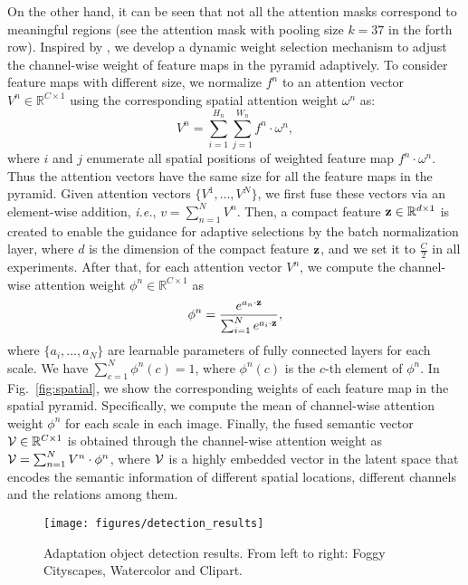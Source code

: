 \documentclass[runningheads]{llncs}
\def\ie{{\em i.e.}}
\begin{document}
On the other hand, it can be seen that not all the attention masks correspond to meaningful regions (see the attention mask with pooling size $k=37$ in the forth row). Inspired by \cite{DBLP:conf/cvpr/LiW0019}, we develop a dynamic weight selection mechanism to adjust the channel-wise weight of feature maps in the pyramid adaptively. To consider feature maps with different size, we normalize $f^n$ to an attention vector $V^{n} \in \mathbb{R}^{C \times 1}$ using the corresponding spatial attention weight $\omega^n$ as:
\begin{equation}
V^n = \sum_{i=1}^{H_n}\sum_{j=1}^{W_n}{f^n \cdot \omega^n},
\end{equation}
where $i$ and $j$ enumerate all spatial positions of weighted feature map $f^n \cdot \omega^n$. Thus the attention vectors have the same size for all the feature maps in the pyramid. Given attention vectors $\{V^1,\dots,V^N\}$, we first fuse these vectors via an element-wise addition, \ie, $v=\sum_{n=1}^NV^n$. Then, a compact feature ${\bf z} \in \mathbb{R}^{d \times 1}$ is created to enable the guidance for adaptive selections by the batch normalization layer, where $d$ is the dimension of the compact feature ${\bf z}$, and we set it to $\frac{C}{2}$ in all experiments. After that, for each attention vector $V^n$, we compute the channel-wise attention weight $\phi^n \in \mathbb{R}^{C \times 1}$ as
\begin{equation}
\phi^n = \frac{e^{a_n\cdot{\bf z}}}{\sum_{i=1}^N{e^{a_i\cdot{\bf z}}}},
\end{equation}
where $\{a_i, \dots, a_N\}$ are learnable parameters of fully connected layers for each scale. We have $\sum_{c=1}^N{\phi^n(c)}=1$, where $\phi^n(c)$ is the $c$-th element of $\phi^n$. In Fig.~\ref{fig:spatial}, we show the corresponding weights of each feature map in the spatial pyramid. Specifically, we compute the mean of channel-wise attention weight $\phi^n$ for each scale in each image. Finally, the fused semantic vector ${\cal V}\in \mathbb{R}^{C \times 1}$ is obtained through the channel-wise attention weight as ${\cal V}=\sum_{n=1}^N{V^n \cdot\phi^n}$, where ${\cal V}$ is a highly embedded vector in the latent space that encodes the semantic information of different spatial locations, different channels and the relations among them.
\begin{figure}[t]
\centering
\texttt{[image: figures/detection\_results]}
\caption{Adaptation object detection results. From left to right: Foggy Cityscapes, Watercolor and Clipart.}
\label{fig:detection}
\end{figure}
\end{document}
